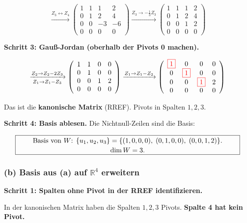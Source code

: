 \documentclass[a4paper,12pt]{article}
\newcommand{\piv}[1]{{\color{red}\boxed{#1}}}
\begin{document}
\[
\xrightarrow{Z_3 \leftrightarrow Z_4}
\left(\begin{array}{cccc}
1 & 1 & 1 & 2 \\
0 & 1 & 2 & 4 \\
0 & 0 & -3 & -6 \\
0 & 0 & 0 & 0
\end{array}\right)
\xrightarrow{Z_3 \to -\frac{1}{3} Z_3}
\left(\begin{array}{cccc}
1 & 1 & 1 & 2 \\
0 & 1 & 2 & 4 \\
0 & 0 & 1 & 2 \\
0 & 0 & 0 & 0
\end{array}\right)
\]

\textbf{Schritt 3: Gau\ss-Jordan (oberhalb der Pivots 0 machen).}

\[
\xrightarrow[Z_1 \to Z_1 - Z_3]{Z_2 \to Z_2 - 2Z_3}
\left(\begin{array}{cccc}
1 & 1 & 0 & 0 \\
0 & 1 & 0 & 0 \\
0 & 0 & 1 & 2 \\
0 & 0 & 0 & 0
\end{array}\right)
\xrightarrow{Z_1 \to Z_1 - Z_2}
\left(\begin{array}{cccc}
\piv{1} & 0 & 0 & 0 \\
0 & \piv{1} & 0 & 0 \\
0 & 0 & \piv{1} & 2 \\
0 & 0 & 0 & 0
\end{array}\right)
\]

Das ist die \textbf{kanonische Matrix} (RREF). Pivots in Spalten $1, 2, 3$.

\textbf{Schritt 4: Basis ablesen.} Die Nichtnull-Zeilen sind die Basis:

\[
\fbox{\parbox{0.93\textwidth}{\centering
Basis von $W$: $\{u_1, u_2, u_3\} = \{(1,0,0,0),\; (0,1,0,0),\; (0,0,1,2)\}.$\\[2pt]
$\dim W = 3$.
}}
\]

\subsubsection*{(b) Basis aus (a) auf $\mathbb{R}^4$ erweitern}

\textbf{Schritt 1: Spalten ohne Pivot in der RREF identifizieren.}

In der kanonischen Matrix haben die Spalten $1, 2, 3$ Pivots. \textbf{Spalte 4 hat kein Pivot.}
\end{document}
